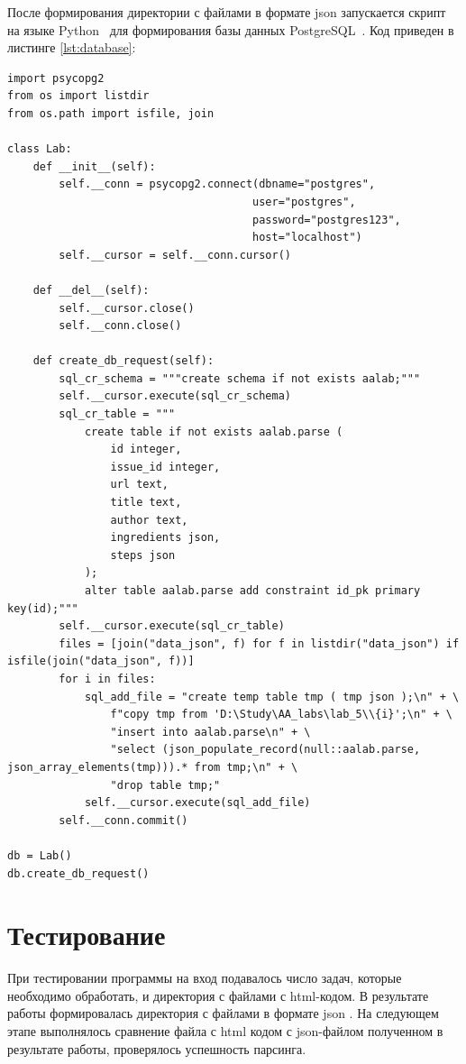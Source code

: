 \documentclass[a4paper, 12pt]{extreport}
\begin{document}
После формирования директории с файлами в формате json запускается скрипт на языке Python~\cite{python3} для 
формирования базы данных PostgreSQL~\cite{pgsql}. Код приведен в листинге \ref{lst:database}:

\begin{lstlisting}[style=code, label=lst:database,caption=Скрипт-создающих таблицу в базе данных]
import psycopg2
from os import listdir
from os.path import isfile, join

class Lab:
    def __init__(self):
        self.__conn = psycopg2.connect(dbname="postgres",
                                      user="postgres",
                                      password="postgres123",
                                      host="localhost")
        self.__cursor = self.__conn.cursor()

    def __del__(self):
        self.__cursor.close()
        self.__conn.close()

    def create_db_request(self):
        sql_cr_schema = """create schema if not exists aalab;"""
        self.__cursor.execute(sql_cr_schema)
        sql_cr_table = """
            create table if not exists aalab.parse (
                id integer,
                issue_id integer,
                url text,
                title text,
                author text,
                ingredients json,
                steps json
            );
            alter table aalab.parse add constraint id_pk primary key(id);"""
        self.__cursor.execute(sql_cr_table)
        files = [join("data_json", f) for f in listdir("data_json") if isfile(join("data_json", f))]
        for i in files:
            sql_add_file = "create temp table tmp ( tmp json );\n" + \
                f"copy tmp from 'D:\Study\AA_labs\lab_5\\{i}';\n" + \
                "insert into aalab.parse\n" + \
                "select (json_populate_record(null::aalab.parse, json_array_elements(tmp))).* from tmp;\n" + \
                "drop table tmp;"
            self.__cursor.execute(sql_add_file)
        self.__conn.commit()

db = Lab()
db.create_db_request()
\end{lstlisting}

\chapter{Тестирование}

При тестировании программы на вход подавалось число задач, которые необходимо обработать, и директория с файлами с 
html-кодом. В результате работы формировалась директория с файлами в формате json . На следующем этапе 
выполнялось сравнение файла с html кодом с json-файлом полученном в результате работы, проверялось успешность парсинга.
\end{document}
